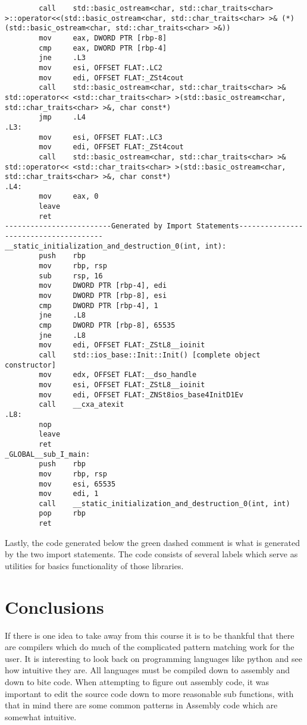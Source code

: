 \documentclass{article}
\theoremstyle{theorem}
\theoremstyle{definition}
\theoremstyle{remark}
\begin{document}
\begin{lstlisting}
        call    std::basic_ostream<char, std::char_traits<char> >::operator<<(std::basic_ostream<char, std::char_traits<char> >& (*)(std::basic_ostream<char, std::char_traits<char> >&))
        mov     eax, DWORD PTR [rbp-8]
        cmp     eax, DWORD PTR [rbp-4]
        jne     .L3
        mov     esi, OFFSET FLAT:.LC2
        mov     edi, OFFSET FLAT:_ZSt4cout
        call    std::basic_ostream<char, std::char_traits<char> >& std::operator<< <std::char_traits<char> >(std::basic_ostream<char, std::char_traits<char> >&, char const*)
        jmp     .L4
.L3:
        mov     esi, OFFSET FLAT:.LC3
        mov     edi, OFFSET FLAT:_ZSt4cout
        call    std::basic_ostream<char, std::char_traits<char> >& std::operator<< <std::char_traits<char> >(std::basic_ostream<char, std::char_traits<char> >&, char const*)
.L4:
        mov     eax, 0
        leave
        ret
-------------------------Generated by Import Statements--------------------------------------
__static_initialization_and_destruction_0(int, int):
        push    rbp
        mov     rbp, rsp
        sub     rsp, 16
        mov     DWORD PTR [rbp-4], edi
        mov     DWORD PTR [rbp-8], esi
        cmp     DWORD PTR [rbp-4], 1
        jne     .L8
        cmp     DWORD PTR [rbp-8], 65535
        jne     .L8
        mov     edi, OFFSET FLAT:_ZStL8__ioinit
        call    std::ios_base::Init::Init() [complete object constructor]
        mov     edx, OFFSET FLAT:__dso_handle
        mov     esi, OFFSET FLAT:_ZStL8__ioinit
        mov     edi, OFFSET FLAT:_ZNSt8ios_base4InitD1Ev
        call    __cxa_atexit
.L8:
        nop
        leave
        ret
_GLOBAL__sub_I_main:
        push    rbp
        mov     rbp, rsp
        mov     esi, 65535
        mov     edi, 1
        call    __static_initialization_and_destruction_0(int, int)
        pop     rbp
        ret
\end{lstlisting}

Lastly, the code generated below the green dashed comment is what is generated by the two import statements. The code consists of several labels which serve as utilities for basics functionality of those libraries.

 
\section{Conclusions}\label{conclusions}

If there is one idea to take away from this course it is to be thankful that there are compilers which do much of the complicated pattern matching work for the user. It is interesting to look back on programming languages like python and see how intuitive they are. All languages must be compiled down to assembly and down to bite code. When attempting to figure out assembly code, it was important to edit the source code down to more reasonable sub functions, with that in mind there are some common patterns in Assembly code which are somewhat intuitive.
\end{document}
